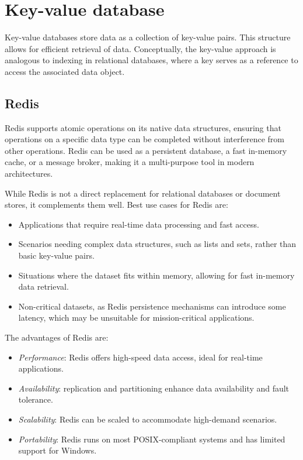 \section{Key-value database}

Key-value databases store data as a collection of key-value pairs. 
This structure allows for efficient retrieval of data. 
Conceptually, the key-value approach is analogous to indexing in relational databases, where a key serves as a reference to access the associated data object.

\subsection{Redis}
Redis supports atomic operations on its native data structures, ensuring that operations on a specific data type can be completed without interference from other operations. 
Redis can be used as a persistent database, a fast in-memory cache, or a message broker, making it a multi-purpose tool in modern architectures. 

While Redis is not a direct replacement for relational databases or document stores, it complements them well. 
Best use cases for Redis are: 
\begin{itemize} 
    \item Applications that require real-time data processing and fast access.
    \item Scenarios needing complex data structures, such as lists and sets, rather than basic key-value pairs.
    \item Situations where the dataset fits within memory, allowing for fast in-memory data retrieval.
    \item Non-critical datasets, as Redis persistence mechanisms can introduce some latency, which may be unsuitable for mission-critical applications.
\end{itemize}
\noindent The advantages of Redis are: 
\begin{itemize}
    \item \textit{Performance}: Redis offers high-speed data access, ideal for real-time applications.
    \item \textit{Availability}: replication and partitioning enhance data availability and fault tolerance.
    \item \textit{Scalability}: Redis can be scaled to accommodate high-demand scenarios.
    \item \textit{Portability}: Redis runs on most POSIX-compliant systems and has limited support for Windows.
\end{itemize}

